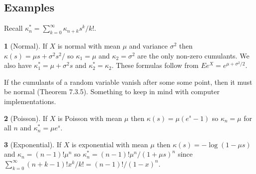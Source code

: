 \documentclass[11pt]{article}
\theoremstyle{definition}
\newtheorem*{example}{}
\begin{document}
\subsection{Examples}
Recall \(\kappa_n^* = \sum_{k=0}^\infty \kappa_{n+k}s^k/k!\).
\begin{example}[Normal]
If \(X\) is normal with mean \(\mu\) and variance \(\sigma^2\) then
\(\kappa(s) = \mu s + \sigma^2s^2/\) so
\(\kappa_1 = \mu\) and \(\kappa_2 = \sigma^2\) are the only non-zero
cumulants. We also have \(\kappa_1^* = \mu + \sigma^2s\)
and \(\kappa_2^* = \kappa_2\).
These formulas follow from \(Ee^X = e^{\mu + \sigma^2/2}\).

If the cumulants of
a random variable vanish after some some point, then it must
be normal\cite{Luk1970} (Theorem 7.3.5).
Something to keep in mind with computer
implementations.
\end{example}
\begin{example}[Poisson]
If \(X\) is Poisson
with mean \(\mu\) then \(\kappa(s) = \mu(e^s - 1)\) so
\(\kappa_n = \mu\) for all \(n\) and
\(\kappa_n^* = \mu e^s\).
\end{example}
\begin{example}[Exponential]
If \(X\) is exponential with mean \(\mu\) then
\(\kappa(s) = -\log(1 - \mu s)\) and
\(\kappa_n = (n - 1)!\mu^n\) so
\(\kappa_n^* = (n-1)!\mu^n/(1 + \mu s)^n\)
since \(\sum_{k=0}^\infty (n + k - 1)!x^k/k!
= (n-1)!/(1 - x)^n\).
\end{example}
\end{document}
